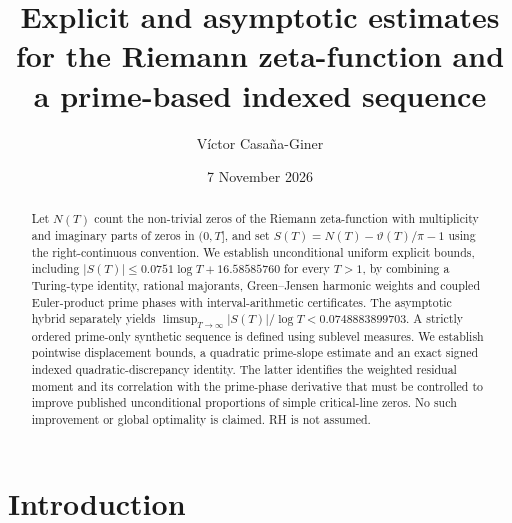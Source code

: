 \documentclass[11pt,reqno]{amsart}
\title[Zeta estimates and prime-based indexed sequence]{Explicit and asymptotic estimates for the Riemann zeta-function and a prime-based indexed sequence}
\author{V\'ictor Casa\~na-Giner}
\date{7 November 2026}
\numberwithin{equation}{section}
\theoremstyle{definition}
\theoremstyle{remark}
\begin{document}
\begin{abstract}
Let $N(T)$ count the non-trivial zeros of the Riemann
zeta-function with multiplicity and imaginary parts of zeros in $(0,T]$,
and set $S(T)=N(T)-\vartheta(T)/\pi-1$ using the
right-continuous convention. We establish unconditional
uniform explicit bounds, including
$|S(T)|\le0.0751\log T+16.58585760$ for every $T>1$,
by combining a Turing-type identity, rational majorants,
Green--Jensen harmonic weights and coupled Euler-product
prime phases with interval-arithmetic certificates.
The asymptotic hybrid separately yields
$\limsup_{T\to\infty}|S(T)|/\log T<0.0748883899703$.
A strictly ordered prime-only synthetic sequence is defined
using sublevel measures. We establish pointwise
displacement bounds, a quadratic prime-slope estimate
and an exact signed indexed quadratic-discrepancy identity.
The latter identifies the weighted residual moment
and its correlation with the prime-phase derivative
that must be controlled to improve published
unconditional proportions of simple critical-line zeros.
No such improvement or global optimality is claimed.
RH is not assumed.

\end{abstract}

\maketitle
\tableofcontents

\section{Introduction}\label{sec:intro}
\end{document}
